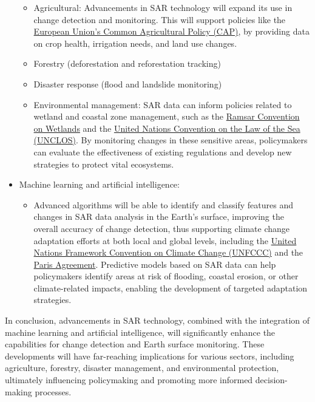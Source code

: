 \documentclass[
  letterpaper,
  DIV=11,
  numbers=noendperiod]{scrreprt}
\providecommand{\tightlist}{%
  \setlength{\itemsep}{0pt}\setlength{\parskip}{0pt}}\usepackage{longtable,booktabs,array}
\begin{document}
\begin{itemize}
  \begin{itemize}
  \tightlist
  \item
    Agricultural: Advancements in SAR technology will expand its use in
    change detection and monitoring. This will support policies like the
    \href{https://ec.europa.eu/info/food-farming-fisheries/key-policies/common-agricultural-policy/cap-glance_en}{European
    Union's Common Agricultural Policy (CAP)}, by providing data on crop
    health, irrigation needs, and land use changes.
  \item
    Forestry (deforestation and reforestation tracking)
  \item
    Disaster response (flood and landslide monitoring)
  \item
    Environmental management: SAR data can inform policies related to
    wetland and coastal zone management, such as the
    \href{https://www.ramsar.org/}{Ramsar Convention on Wetlands} and
    the
    \href{https://www.un.org/Depts/los/convention_agreements/convention_overview_convention.htm}{United
    Nations Convention on the Law of the Sea (UNCLOS)}. By monitoring
    changes in these sensitive areas, policymakers can evaluate the
    effectiveness of existing regulations and develop new strategies to
    protect vital ecosystems.
  \end{itemize}
\item
  Machine learning and artificial intelligence:

  \begin{itemize}
  \tightlist
  \item
    Advanced algorithms will be able to identify and classify features
    and changes in SAR data analysis in the Earth's surface, improving
    the overall accuracy of change detection, thus supporting climate
    change adaptation efforts at both local and global levels, including
    the \href{https://unfccc.int/}{United Nations Framework Convention
    on Climate Change (UNFCCC)} and the \href{https://unfccc.int/}{Paris
    Agreement}. Predictive models based on SAR data can help
    policymakers identify areas at risk of flooding, coastal erosion, or
    other climate-related impacts, enabling the development of targeted
    adaptation strategies.
  \end{itemize}
\end{itemize}

In conclusion, advancements in SAR technology, combined with the
integration of machine learning and artificial intelligence, will
significantly enhance the capabilities for change detection and Earth
surface monitoring. These developments will have far-reaching
implications for various sectors, including agriculture, forestry,
disaster management, and environmental protection, ultimately
influencing policymaking and promoting more informed decision-making
processes.
\end{document}
